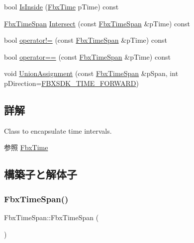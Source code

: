 \begin{DoxyCompactItemize}
\item 
bool \hyperlink{class_fbx_time_span_a969295da345c8c9e574acbbcda1d59e0}{Is\+Inside} (\hyperlink{class_fbx_time}{Fbx\+Time} p\+Time) const
\item 
\hyperlink{class_fbx_time_span}{Fbx\+Time\+Span} \hyperlink{class_fbx_time_span_a8be395bd3e5dfbdcd2bc1551832e04b1}{Intersect} (const \hyperlink{class_fbx_time_span}{Fbx\+Time\+Span} \&p\+Time) const
\item 
bool \hyperlink{class_fbx_time_span_a2dd0bd644b3c8eb5fb79cc2866ea0420}{operator!=} (const \hyperlink{class_fbx_time_span}{Fbx\+Time\+Span} \&p\+Time) const
\item 
bool \hyperlink{class_fbx_time_span_a1dac810b3c1c123bd3055befb96e42f7}{operator==} (const \hyperlink{class_fbx_time_span}{Fbx\+Time\+Span} \&p\+Time) const
\item 
void \hyperlink{class_fbx_time_span_af5159fe30c3baa37728c12ac167a28ba}{Union\+Assignment} (const \hyperlink{class_fbx_time_span}{Fbx\+Time\+Span} \&p\+Span, int p\+Direction=\hyperlink{fbxtime_8h_aa80e034e7196b05b47f7bc58a5e2ce49}{F\+B\+X\+S\+D\+K\+\_\+\+T\+I\+M\+E\+\_\+\+F\+O\+R\+W\+A\+RD})
\end{DoxyCompactItemize}


\subsection{詳解}
Class to encapsulate time intervals.

\begin{DoxySeeAlso}{参照}
\hyperlink{class_fbx_time}{Fbx\+Time} 
\end{DoxySeeAlso}


\subsection{構築子と解体子}
\mbox{\label{class_fbx_time_span_a4eed31104b9afeb2b1a53bd7b2b1f823}} 
\subsubsection{\texorpdfstring{Fbx\+Time\+Span()}{FbxTimeSpan()}\hspace{0.1cm}{\footnotesize\ttfamily [1/2]}}
{\footnotesize\ttfamily Fbx\+Time\+Span\+::\+Fbx\+Time\+Span (\begin{DoxyParamCaption}{ }\end{DoxyParamCaption})}



